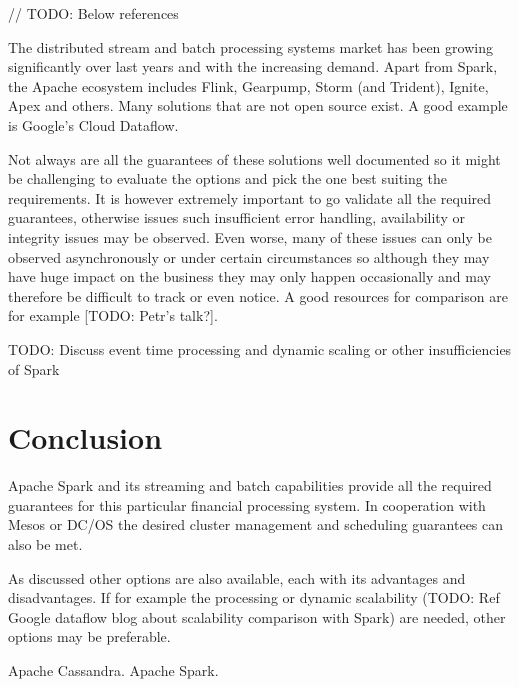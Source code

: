\documentclass[a4paper, 10 pt, conference]{IEEEtran}
\begin{document}
// TODO: Below references

The distributed stream and batch processing systems market has been growing significantly over last years and with the increasing demand. Apart from Spark, the Apache ecosystem includes Flink, Gearpump, Storm (and Trident), Ignite, Apex and others. Many solutions that are not open source exist. A good example is Google's Cloud Dataflow.

Not always are all the guarantees of these solutions well documented so it might be challenging to evaluate the options and pick the one best suiting the requirements. It is however extremely important to go validate all the required guarantees, otherwise issues such insufficient error handling, availability or integrity issues may be observed. Even worse, many of these issues can only be observed asynchronously or under certain circumstances so although they may have huge impact on the business they may only happen occasionally and may therefore be difficult to track or even notice. A good resources for comparison are for example [TODO: Petr's talk?].

TODO: Discuss event time processing and dynamic scaling or other insufficiencies of Spark

\section{Conclusion}
Apache Spark and its streaming and batch capabilities provide all the required guarantees for this particular financial processing system. In cooperation with Mesos or DC/OS the desired cluster management and scheduling guarantees can also be met. 

As discussed other options are also available, each with its advantages and disadvantages. If for example the processing or dynamic scalability (TODO: Ref Google dataflow blog about scalability comparison with Spark) are needed, other options may be preferable.


\addtolength{\textheight}{-12cm}  %

\begin{thebibliography}{99}
 Apache Cassandra.
 Apache Spark.
\end{thebibliography}
\end{document}
